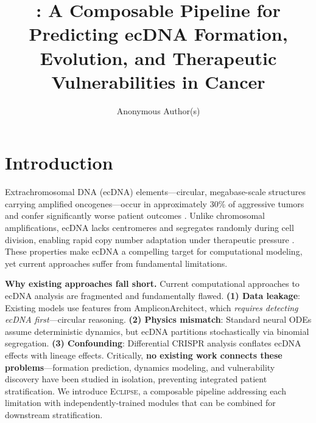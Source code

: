 \documentclass[sigconf,anonymous]{acmart}
\title{\eclipse{}: A Composable Pipeline for Predicting ecDNA Formation, Evolution, and Therapeutic Vulnerabilities in Cancer}
\author{Anonymous Author(s)}
\affiliation{%
  \institution{Anonymous Institution}
  \city{City}
  \country{Country}
}
\newcommand{\eclipse}{\textsc{Eclipse}}
\begin{document}
\maketitle

\section{Introduction}
\label{sec:intro}

Extrachromosomal DNA (ecDNA) elements---circular, megabase-scale structures carrying amplified oncogenes---occur in approximately 30\% of aggressive tumors and confer significantly worse patient outcomes \cite{kim_2020_ecdna_prognosis}. Unlike chromosomal amplifications, ecDNA lacks centromeres and segregates randomly during cell division, enabling rapid copy number adaptation under therapeutic pressure \cite{nathanson_2014_targeted, lange_2022_mathematical}. These properties make ecDNA a compelling target for computational modeling, yet current approaches suffer from fundamental limitations.

\textbf{Why existing approaches fall short.} Current computational approaches to ecDNA analysis are fragmented and fundamentally flawed. \textbf{(1) Data leakage}: Existing models use features from AmpliconArchitect, which \textit{requires detecting ecDNA first}---circular reasoning. \textbf{(2) Physics mismatch}: Standard neural ODEs assume deterministic dynamics, but ecDNA partitions stochastically via binomial segregation. \textbf{(3) Confounding}: Differential CRISPR analysis conflates ecDNA effects with lineage effects. Critically, \textbf{no existing work connects these problems}---formation prediction, dynamics modeling, and vulnerability discovery have been studied in isolation, preventing integrated patient stratification. We introduce \eclipse{}, a composable pipeline addressing each limitation with independently-trained modules that can be combined for downstream stratification.
\end{document}
